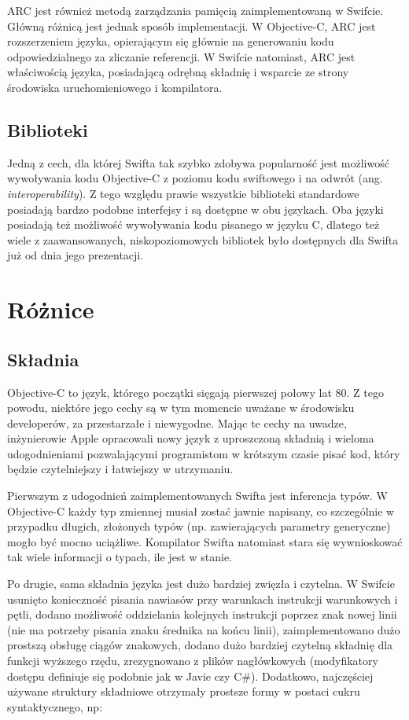\documentclass[mgr, shortabstract]{iithesis}
\newcommand{\ang}[1]{ang. \textit{#1}}
\begin{document}
ARC jest również metodą zarządzania pamięcią zaimplementowaną w Swifcie. Główną różnicą jest jednak sposób implementacji. W Objective-C, ARC jest rozszerzeniem języka, opierającym się głównie na  generowaniu kodu odpowiedzialnego za zliczanie referencji. W Swifcie natomiast, ARC jest właściwością języka, posiadającą odrębną składnię i wsparcie ze strony środowiska uruchomieniowego i kompilatora.

\subsection{Biblioteki}

Jedną z cech, dla której Swifta tak szybko zdobywa popularność jest możliwość wywoływania kodu Objective-C z poziomu kodu swiftowego i na odwrót (\ang{interoperability}). Z tego względu prawie wszystkie biblioteki standardowe posiadają bardzo podobne interfejsy i są dostępne w obu językach. Oba języki posiadają też możliwość wywoływania kodu pisanego w języku C, dlatego też wiele z zaawansowanych, niskopoziomowych bibliotek było dostępnych dla Swifta już od dnia jego prezentacji.

\section{Różnice}

\subsection{Składnia}

Objective-C to język, którego początki sięgają pierwszej połowy lat 80. Z tego powodu, niektóre jego cechy są w tym momencie uważane w środowisku developerów, za przestarzałe i niewygodne. Mając te cechy na uwadze, inżynierowie Apple opracowali nowy język z uproszczoną składnią i wieloma udogodnieniami pozwalającymi programistom w krótszym czasie pisać kod, który będzie czytelniejszy i łatwiejszy w utrzymaniu.

Pierwszym z udogodnień zaimplementowanych Swifta jest inferencja typów. W Objective-C każdy typ zmiennej musiał zostać jawnie napisany, co szczególnie w przypadku długich, złożonych typów (np. zawierających parametry generyczne) mogło być mocno uciążliwe. Kompilator Swifta natomiast stara się wywnioskować tak wiele informacji o typach, ile jest w stanie.

Po drugie, sama składnia języka jest dużo bardziej zwięzła i czytelna. W Swifcie usunięto konieczność pisania nawiasów przy warunkach instrukcji warunkowych i pętli, dodano możliwość oddzielania kolejnych instrukcji poprzez znak nowej linii (nie ma potrzeby pisania znaku średnika na końcu linii), zaimplementowano dużo prostszą obsługę ciągów znakowych, dodano dużo bardziej czytelną składnię dla funkcji wyższego rzędu, zrezygnowano z plików nagłówkowych (modyfikatory dostępu definiuje się podobnie jak w Javie czy C\#). Dodatkowo, najczęściej używane struktury składniowe otrzymały prostsze formy w postaci cukru syntaktycznego, np:
\end{document}
